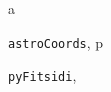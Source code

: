 \documentclass[letterpaper,10pt,english]{sphinxmanual}
\begin{document}
\renewcommand{\indexname}{Python Module Index}
\begin{theindex}
\def\bigletter#1{{\Large\sffamily#1}\nopagebreak\vspace{1mm}}
\bigletter{a}
\item {\texttt{astroCoords}}, \pageref{index:module-astroCoords}
\indexspace
\bigletter{p}
\item {\texttt{pyFitsidi}}, \pageref{index:module-pyFitsidi}
\end{theindex}

\renewcommand{\indexname}{Index}
\printindex
\end{document}
